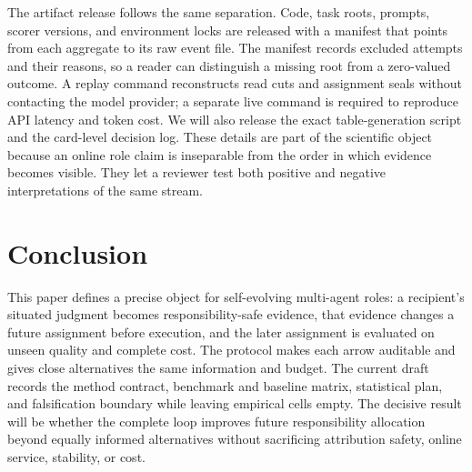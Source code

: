 \documentclass[sigconf,anonymous]{aamas}
\begin{document}
The artifact release follows the same separation. Code, task roots, prompts, scorer versions, and environment locks are released with a manifest that points from each aggregate to its raw event file. The manifest records excluded attempts and their reasons, so a reader can distinguish a missing root from a zero-valued outcome. A replay command reconstructs read cuts and assignment seals without contacting the model provider; a separate live command is required to reproduce API latency and token cost. We will also release the exact table-generation script and the card-level decision log. These details are part of the scientific object because an online role claim is inseparable from the order in which evidence becomes visible. They let a reviewer test both positive and negative interpretations of the same stream.

\section{Conclusion}

This paper defines a precise object for self-evolving multi-agent roles: a recipient's situated judgment becomes responsibility-safe evidence, that evidence changes a future assignment before execution, and the later assignment is evaluated on unseen quality and complete cost. The protocol makes each arrow auditable and gives close alternatives the same information and budget. The current draft records the method contract, benchmark and baseline matrix, statistical plan, and falsification boundary while leaving empirical cells empty. The decisive result will be whether the complete loop improves future responsibility allocation beyond equally informed alternatives without sacrificing attribution safety, online service, stability, or cost.



\end{document}

